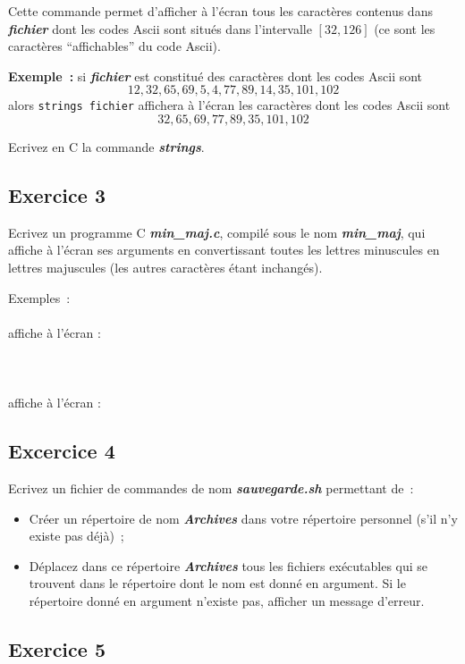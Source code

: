 \documentclass[10pt]{article}
\newcommand{\unix}[1]{\hspace*{2cm}{\tt #1}}
\newcommand{\fich}[1]{{\bf \em #1}}
\begin{document}
Cette commande permet d'afficher à l'écran tous les caractères contenus dans 
\fich{fichier} dont les codes Ascii sont situés dans l'intervalle \mbox{$[32, 126]$}
(ce sont les caractères ``affichables'' du code Ascii).

{\bf Exemple~:}
si \fich{fichier} est constitué des caractères dont les codes Ascii 
sont  
\[
12, 32, 65, 69, 5, 4, 77, 89, 14, 35, 101, 102  
\]
alors {\tt strings fichier} affichera à l'écran les caractères dont les 
codes Ascii sont
\[
32, 65, 69, 77, 89, 35, 101, 102
\] 

Ecrivez en C la commande \fich{strings}.

\subsection*{Exercice 3}

Ecrivez un programme C \fich{min\_maj.c}, compilé sous le nom \fich{min\_maj},
qui affiche à l'écran ses arguments en convertissant toutes les lettres 
minuscules en lettres majuscules (les autres caractères étant inchangés).

Exemples~: \\
	\unix{min\_maj bOnNE nUIt LES petits ...} \\ 
affiche à l'écran : \\
	\unix{BONNE NUIT LES PETITS ...} \\
~\\
	\unix{min\_maj Vive Inf\_122 !} \\
affiche à l'écran : \\
	\unix{VIVE INF\_122 !}

\subsection*{Excercice 4}

Ecrivez un fichier de commandes de nom \fich{sauvegarde.sh} permettant de~: 
\begin{itemize}
\item 
	Créer un répertoire de nom \fich{Archives} dans votre répertoire 
	personnel (s'il n'y existe pas déjà)~;
\item
	Déplacez dans ce répertoire \fich{Archives} tous les fichiers exécutables 
	qui se trouvent dans le répertoire dont le nom est donné en argument. 
        Si le répertoire donné en argument n'existe pas, afficher un message d'erreur.    
\end{itemize}

\subsection*{Exercice 5}
\end{document}
